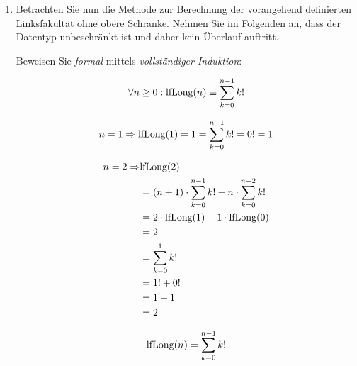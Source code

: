 \documentclass{lehramt-informatik-aufgabe}
\begin{document}
\begin{enumerate}
\begin{liAntwort}
\end{liAntwort}


\item Betrachten Sie nun die Methode  zur
Berechnung der vorangehend definierten Linksfakultät ohne obere
Schranke. Nehmen Sie im Folgenden an, dass der Datentyp
 unbeschränkt ist und daher kein Überlauf auftritt.


Beweisen Sie \emph{formal} mittels \emph{vollständiger Induktion}:

\begin{displaymath}
\forall n \geq 0: \text{lfLong}(n) \equiv \sum^{n-1}_{k=0}k!
\end{displaymath}

\begin{liAntwort}

%

\liInduktionAnfang

\begin{displaymath}
n=1 \Rightarrow
\text{lfLong}(1) =
1 =
\sum^{n-1}_{k=0}k! =
0! =
1
\end{displaymath}

\begin{equation*}
\begin{split}
n=2 \Rightarrow & \text{lfLong}(2)\\
& = (n+1) \cdot \sum^{n-1}_{k=0}k! - n \cdot \sum^{n-2}_{k=0}k! \\
& = 2 \cdot \text{lfLong}(1) - 1 \cdot \text{lfLong}(0) \\
& = 2 \\
& = \sum^{1}_{k=0}k! \\
& = 1! + 0! \\
& = 1 + 1 \\
& = 2
\end{split}
\end{equation*}

%

\liInduktionVoraussetzung

\begin{displaymath}
\text{lfLong}(n) = \sum^{n-1}_{k=0}k!
\end{displaymath}

%

\liInduktionSchritt


\end{liAntwort}
\end{enumerate}
\end{document}
